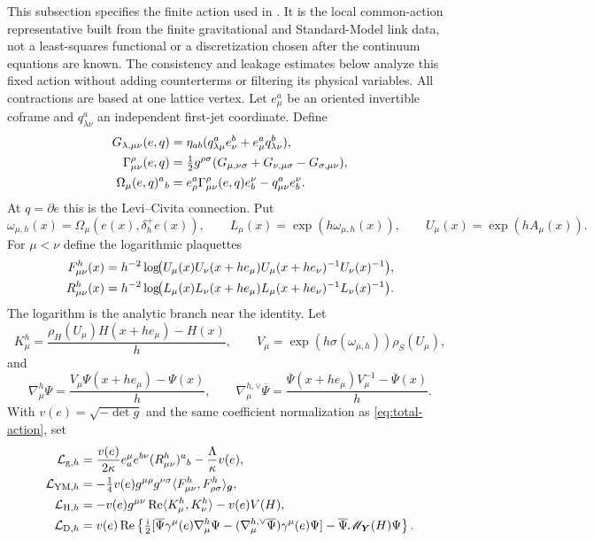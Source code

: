 \documentclass[11pt]{article}
\numberwithin{equation}{section}
\theoremstyle{definition}
\theoremstyle{remark}
\newcommand{\ii}{\mathrm i}
\newcommand{\Rea}{\operatorname{Re}}
\newcommand{\ip}[2]{\langle#1,#2\rangle}
\newcommand{\bPsi}{\overline\Psi}
\begin{document}
This subsection specifies the finite action used in .  It is the local common-action representative built from the finite gravitational and Standard-Model link data, not a least-squares functional or a discretization chosen after the continuum equations are known.  The consistency and leakage estimates below analyze this fixed action without adding counterterms or filtering its physical variables.  All contractions are based at one lattice vertex.  Let $e^a_\mu$ be an oriented invertible coframe and $q^a_{\lambda\nu}$ an independent first-jet coordinate.  Define
\begin{align}
 G_{\lambda,\mu\nu}(e,q)
 &=\eta_{ab}(q^a_{\lambda\mu}e^b_\nu+e^a_\mu q^b_{\lambda\nu}),\notag\\
 \Gamma^\rho_{\mu\nu}(e,q)
 &=\tfrac12g^{\rho\sigma}(G_{\mu,\nu\sigma}+G_{\nu,\mu\sigma}-G_{\sigma,\mu\nu}),\notag\\
 \Omega_\mu(e,q)^a{}_b
 &=e^a_\rho\Gamma^\rho_{\mu\nu}(e,q)e_b^\nu-q^a_{\mu\nu}e_b^\nu.
 \label{eq:native-LC-reader}
\end{align}
At $q=\partial e$ this is the Levi--Civita connection.  Put
\[
 \omega_{\mu,h}(x)=\Omega_\mu(e(x),\delta_h^+e(x)),
 \qquad L_\mu(x)=\exp(h\omega_{\mu,h}(x)),
 \qquad U_\mu(x)=\exp(hA_\mu(x)).
\]
For $\mu<\nu$ define the logarithmic plaquettes
\begin{align}
 F^h_{\mu\nu}(x)&=h^{-2}\log\!\bigl(U_\mu(x)U_\nu(x+h e_\mu)
 U_\mu(x+h e_\nu)^{-1}U_\nu(x)^{-1}\bigr),\notag\\
 R^h_{\mu\nu}(x)&=h^{-2}\log\!\bigl(L_\mu(x)L_\nu(x+h e_\mu)
 L_\mu(x+h e_\nu)^{-1}L_\nu(x)^{-1}\bigr).
 \label{eq:native-plaquettes}
\end{align}
The logarithm is the analytic branch near the identity.  Let
\begin{equation}
 K^h_\mu=\frac{\rho_H(U_\mu)H(x+h e_\mu)-H(x)}h,
 \qquad
 V_\mu=\exp(h\sigma(\omega_{\mu,h}))\rho_S(U_\mu),
 \label{eq:native-matter-links}
\end{equation}
and
\begin{equation}
 \nabla^h_\mu\Psi=\frac{V_\mu\Psi(x+h e_\mu)-\Psi(x)}h,
 \qquad
 \nabla^{h,\vee}_\mu\bPsi
 =\frac{\bPsi(x+h e_\mu)V_\mu^{-1}-\bPsi(x)}h.
 \label{eq:native-spin-differences}
\end{equation}
With $v(e)=\sqrt{-\det g}$ and the same coefficient normalization as \eqref{eq:total-action}, set
\begin{align}
 \mathcal L_{{\rm g},h}
 &=\frac{v(e)}{2\kappa}e_a^\mu e^{b\nu}(R^h_{\mu\nu})^a{}_b
    -\frac{\Lambda}{\kappa}v(e),\notag\\
 \mathcal L_{{\rm YM},h}
 &=-\tfrac14v(e)g^{\mu\rho}g^{\nu\sigma}
      \ip{F^h_{\mu\nu}}{F^h_{\rho\sigma}}_{\boldsymbol g},\notag\\
 \mathcal L_{{\rm H},h}
 &=-v(e)g^{\mu\nu}\Rea\ip{K^h_\mu}{K^h_\nu}-v(e)V(H),\notag\\
 \mathcal L_{{\rm D},h}
 &=v(e)\Rea\left\{\tfrac{\ii}{2}
 [\bPsi\gamma^\mu(e)\nabla^h_\mu\Psi
 -(\nabla^{h,\vee}_\mu\bPsi)\gamma^\mu(e)\Psi]
 -\bPsi\mathscr M_{\boldsymbol Y}(H)\Psi\right\}.
 \label{eq:native-densities}
\end{align}
\end{document}
